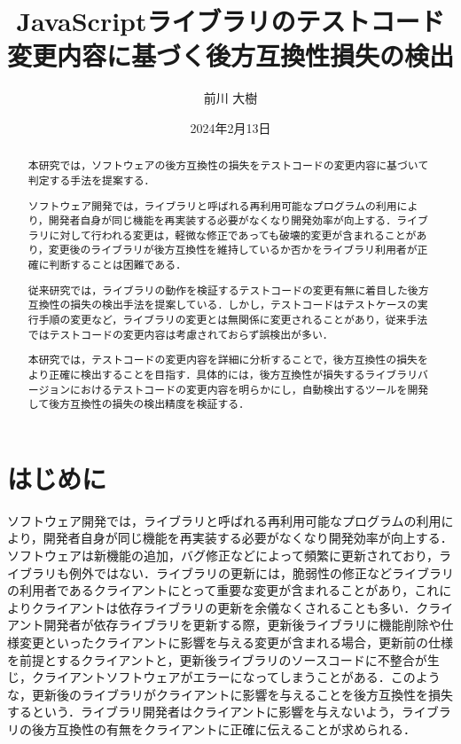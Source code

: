 \documentclass[11pt,dvipdfmx]{jreport}
\title{JavaScriptライブラリのテストコード変更内容に基づく後方互換性損失の検出}
\author{前川 大樹}
\date{2024年2月13日}	%
\begin{document}
\maketitle

\begin{abstract}
本研究では，ソフトウェアの後方互換性の損失をテストコードの変更内容に基づいて判定する手法を提案する．

ソフトウェア開発では，ライブラリと呼ばれる再利用可能なプログラムの利用により，開発者自身が同じ機能を再実装する必要がなくなり開発効率が向上する．ライブラリに対して行われる変更は，軽微な修正であっても破壊的変更が含まれることがあり，変更後のライブラリが後方互換性を維持しているか否かをライブラリ利用者が正確に判断することは困難である．

従来研究では，ライブラリの動作を検証するテストコードの変更有無に着目した後方互換性の損失の検出手法を提案している．しかし，テストコードはテストケースの実行手順の変更など，ライブラリの変更とは無関係に変更されることがあり，従来手法ではテストコードの変更内容は考慮されておらず誤検出が多い．

本研究では，テストコードの変更内容を詳細に分析することで，後方互換性の損失をより正確に検出することを目指す．具体的には，後方互換性が損失するライブラリバージョンにおけるテストコードの変更内容を明らかにし，自動検出するツールを開発して後方互換性の損失の検出精度を検証する．

\end{abstract}

\tableofcontents



\newpage
{}	%



\chapter{はじめに}
ソフトウェア開発では，ライブラリと呼ばれる再利用可能なプログラムの利用により，開発者自身が同じ機能を再実装する必要がなくなり開発効率が向上する\cite{shared-software}\cite{effect-on-developer}．ソフトウェアは新機能の追加，バグ修正などによって頻繁に更新されており，ライブラリも例外ではない\cite{library-analysis}．ライブラリの更新には，脆弱性の修正などライブラリの利用者であるクライアントにとって重要な変更が含まれることがあり，これによりクライアントは依存ライブラリの更新を余儀なくされることも多い．クライアント開発者が依存ライブラリを更新する際，更新後ライブラリに機能削除や仕様変更といったクライアントに影響を与える変更が含まれる場合，更新前の仕様を前提とするクライアントと，更新後ライブラリのソースコードに不整合が生じ，クライアントソフトウェアがエラーになってしまうことがある．このような，更新後のライブラリがクライアントに影響を与えることを後方互換性を損失するという．ライブラリ開発者はクライアントに影響を与えないよう，ライブラリの後方互換性の有無をクライアントに正確に伝えることが求められる．
\end{document}
